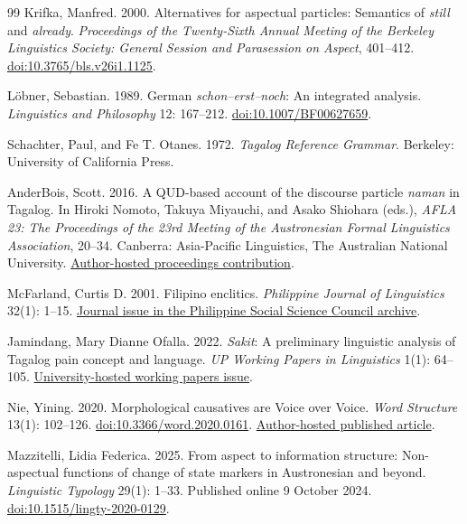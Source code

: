 \begin{thebibliography}{99}
Krifka, Manfred. 2000.
Alternatives for aspectual particles: Semantics of \textit{still} and \textit{already}.
\textit{Proceedings of the Twenty-Sixth Annual Meeting of the Berkeley Linguistics Society:
General Session and Parasession on Aspect}, 401--412.
\href{https://doi.org/10.3765/bls.v26i1.1125}{doi:10.3765/bls.v26i1.1125}.

Löbner, Sebastian. 1989.
German \textit{schon--erst--noch}: An integrated analysis.
\textit{Linguistics and Philosophy} 12: 167--212.
\href{https://doi.org/10.1007/BF00627659}{doi:10.1007/BF00627659}.

Schachter, Paul, and Fe T. Otanes. 1972.
\textit{Tagalog Reference Grammar}.
Berkeley: University of California Press.

AnderBois, Scott. 2016.
A QUD-based account of the discourse particle \textit{naman} in Tagalog.
In Hiroki Nomoto, Takuya Miyauchi, and Asako Shiohara (eds.),
\textit{AFLA 23: The Proceedings of the 23rd Meeting of the Austronesian
Formal Linguistics Association}, 20--34.
Canberra: Asia-Pacific Linguistics, The Australian National University.
\href{https://anderbois.github.io/PDFs/AFLA23_AnderBois.pdf}{Author-hosted proceedings contribution}.

McFarland, Curtis D. 2001.
Filipino enclitics.
\textit{Philippine Journal of Linguistics} 32(1): 1--15.
\href{https://pssc.org.ph/wp-content/pssc-archives/Philippine%20Journal%20of%20Linguistics/2001/JUNE%202001%2C%20VOL%2032%20No%201.pdf}{Journal issue in the Philippine Social Science Council archive}.

Jamindang, Mary Dianne Ofalla. 2022.
\textit{Sakit}: A preliminary linguistic analysis of Tagalog pain concept and language.
\textit{UP Working Papers in Linguistics} 1(1): 64--105.
\href{https://linguistics.upd.edu.ph/wp-content/uploads/2022/08/UPWPL-Vol.-1-2022-Final-v20220828.pdf}{University-hosted working papers issue}.

Nie, Yining. 2020.
Morphological causatives are Voice over Voice.
\textit{Word Structure} 13(1): 102--126.
\href{https://doi.org/10.3366/word.2020.0161}{doi:10.3366/word.2020.0161}.
\href{https://yiningnie.github.io/files/Nie-2020-Morphological-causatives.pdf}{Author-hosted published article}.

Mazzitelli, Lidia Federica. 2025.
From aspect to information structure: Non-aspectual functions of change of
state markers in Austronesian and beyond.
\textit{Linguistic Typology} 29(1): 1--33. Published online 9 October 2024.
\href{https://doi.org/10.1515/lingty-2020-0129}{doi:10.1515/lingty-2020-0129}.


\end{thebibliography}
